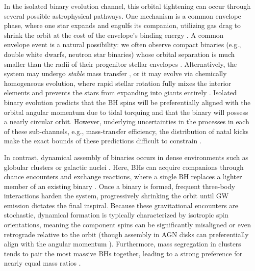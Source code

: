 \begin{refsection}
In the isolated binary evolution channel, this orbital tightening can occur through several possible astrophysical pathways. One mechanism is a common envelope phase, where one star expands and engulfs its companion, utilizing gas drag to shrink the orbit at the cost of the envelope's binding energy \citep{Ivanova:2012vx}. A common envelope event is a natural possibility: we often observe compact binaries (e.g., double white dwarfs, neutron star binaries) whose orbital separation is much smaller than the radii of their progenitor stellar envelopes \citep{Paczynski_1976}. Alternatively, the system may undergo \textit{stable} mass transfer \citep{vandenHeuvel:2017pwp, Gallegos-Garcia:2021hti, van_son_no_2022}, or it may evolve via chemically homogeneous evolution, where rapid stellar rotation fully mixes the interior elements and prevents the stars from expanding into giants entirely \citep{Marchant:2016, Mandel:2015qlu}. Isolated binary evolution predicts that the \ac{BH} spins will be preferentially aligned with the orbital angular momentum due to tidal torquing and that the binary will possess a nearly circular orbit. However, underlying uncertainties in the processes in each of these sub-channels, e.g., mass-transfer efficiency, the distribution of natal kicks make the exact bounds of these predictions difficult to constrain \citep[e.g.,][]{Mandel:2021smh}. 

In contrast, dynamical assembly of binaries occurs in dense environments such as globular clusters or galactic nuclei \citep{Hut:1992wz, 1993Natur.364..421K, rodriguez_dynamical_2016}. Here, \acp{BH} can acquire companions through chance encounters and exchange reactions, where a single \ac{BH} replaces a lighter member of an existing binary \citep[e.g.,][]{Mapelli:2021taw}. Once a binary is formed, frequent three-body interactions harden the system, progressively shrinking the orbit until \ac{GW} emission dictates the final inspiral. Because these gravitational encounters are stochastic, dynamical formation is typically characterized by isotropic spin orientations, meaning the component spins can be significantly misaligned or even retrograde relative to the orbit (though assembly in AGN disks can preferentially align with the angular momentum \citep{Bartos_2017,  Tagawa:2019osr, Santini:2023ukl}). Furthermore, mass segregation in clusters tends to pair the most massive \acp{BH} together, leading to a strong preference for nearly equal mass ratios \citep{spitzer_equipartition_1969, atakan_gurkan_formation_2004}.


\end{refsection}
